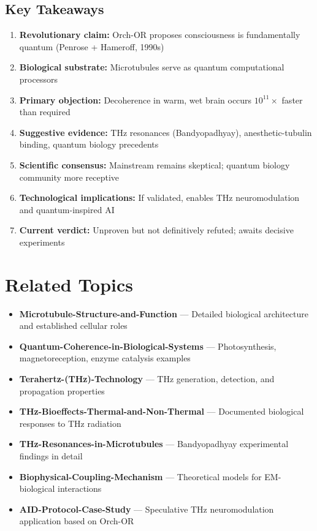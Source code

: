 \subsection{Key Takeaways}

\begin{enumerate}
\item \textbf{Revolutionary claim:} Orch-OR proposes consciousness is fundamentally quantum (Penrose + Hameroff, 1990s)
\item \textbf{Biological substrate:} Microtubules serve as quantum computational processors
\item \textbf{Primary objection:} Decoherence in warm, wet brain occurs $10^{11}\times$ faster than required
\item \textbf{Suggestive evidence:} THz resonances (Bandyopadhyay), anesthetic-tubulin binding, quantum biology precedents
\item \textbf{Scientific consensus:} Mainstream remains skeptical; quantum biology community more receptive
\item \textbf{Technological implications:} If validated, enables THz neuromodulation and quantum-inspired AI
\item \textbf{Current verdict:} Unproven but not definitively refuted; awaits decisive experiments
\end{enumerate}

\section{Related Topics}

\begin{itemize}
\item \textbf{Microtubule-Structure-and-Function} --- Detailed biological architecture and established cellular roles
\item \textbf{Quantum-Coherence-in-Biological-Systems} --- Photosynthesis, magnetoreception, enzyme catalysis examples
\item \textbf{Terahertz-(THz)-Technology} --- THz generation, detection, and propagation properties
\item \textbf{THz-Bioeffects-Thermal-and-Non-Thermal} --- Documented biological responses to THz radiation
\item \textbf{THz-Resonances-in-Microtubules} --- Bandyopadhyay experimental findings in detail
\item \textbf{Biophysical-Coupling-Mechanism} --- Theoretical models for EM-biological interactions
\item \textbf{AID-Protocol-Case-Study} --- Speculative THz neuromodulation application based on Orch-OR
\end{itemize}


